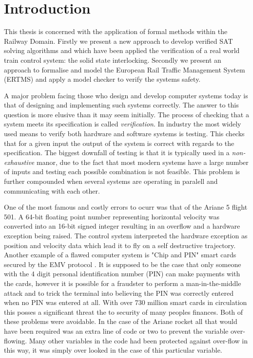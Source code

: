 

\section{Introduction}

This thesis is concerned with the application of formal methods within the Railway Domain. Firstly we present a new approach to develop verified SAT solving algorithms and which have been applied the verification of a real world train control system: the solid state interlocking. Secondly we present an approach to formalise and model the European Rail Traffic Management System (ERTMS) and apply a model checker to verify the systems safety.

A major problem facing those who design and develop computer systems today is  that of designing and implementing such systems correctly. The answer to this question is more elusive than it may seem initially. The process of checking that a system meets its specification is called \emph{verification}. In industry the most widely used means to verify both hardware and software systems is testing. This checks that for a given input the output of the system is correct with regards to the specification. The biggest downfall of testing is that it is typically used in a \emph{non-exhaustive} manor, due to the fact that most modern systems have a large number of inputs and testing each possible combination is not feasible. This problem is further compounded when several systems are operating in paralell and communicating with each other.

One of the most famous and costly errors to ocurr was that of the Ariane 5 flight 501\cite{GL97}. A 64-bit floating point number representing horizontal velocity was converted into an 16-bit signed integer resulting in an overflow and a hardware exception being raised. The control system interpreted the hardware exception as position and velocity data which lead it to fly on a self destructive trajectory. Another example of a flawed computer system is "Chip and PIN" smart cards secured by the EMV protocol \cite{JM10}. It is supposed to be the case that only someone with the 4 digit personal identification number (PIN) can make payments with the cards, however it is possible for a fraudster to perform a man-in-the-middle attack and to trick the terminal into believing the PIN was correctly entered when no PIN was entered at all. With over 730 million smart cards in circulation this posses a significant threat the to security of many peoples finances. Both of these problems were avoidable. In the case of the Ariane rocket all that would have been required was an extra line of code or two to prevent the variable over-flowing. Many other variables in the code had been protected against over-flow in this way, it was simply over looked in the case of this particular variable.


